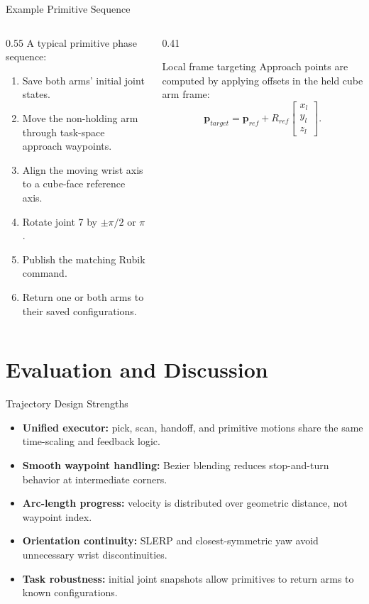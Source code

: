 \documentclass[10pt,aspectratio=169]{beamer}
\begin{document}
\begin{frame}{Example Primitive Sequence}
  \begin{columns}[T]
    \begin{column}{0.55\textwidth}
      A typical primitive phase sequence:
      \begin{enumerate}
        \item Save both arms' initial joint states.
        \item Move the non-holding arm through task-space approach waypoints.
        \item Align the moving wrist axis to a cube-face reference axis.
        \item Rotate joint 7 by $\pm\pi/2$ or $\pi$.
        \item Publish the matching Rubik command.
        \item Return one or both arms to their saved configurations.
      \end{enumerate}
    \end{column}
    \begin{column}{0.41\textwidth}
      \begin{block}{Local frame targeting}
        Approach points are computed by applying offsets in the held cube arm frame:
        \[
          \mathbf{p}_{target}
          =
          \mathbf{p}_{ref}
          +
          R_{ref}
          \begin{bmatrix}
          x_l\\y_l\\z_l
          \end{bmatrix}.
        \]
      \end{block}
    \end{column}
  \end{columns}
\end{frame}

\section{Evaluation and Discussion}

\begin{frame}{Trajectory Design Strengths}
  \begin{itemize}
    \item \textbf{Unified executor:} pick, scan, handoff, and primitive motions share the same time-scaling and feedback logic.
    \item \textbf{Smooth waypoint handling:} Bezier blending reduces stop-and-turn behavior at intermediate corners.
    \item \textbf{Arc-length progress:} velocity is distributed over geometric distance, not waypoint index.
    \item \textbf{Orientation continuity:} SLERP and closest-symmetric yaw avoid unnecessary wrist discontinuities.
    \item \textbf{Task robustness:} initial joint snapshots allow primitives to return arms to known configurations.
  \end{itemize}
\end{frame}
\end{document}
